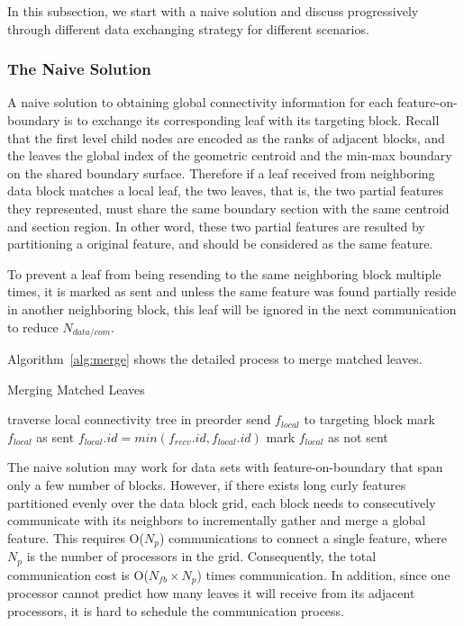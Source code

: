 In this subsection, we start with a naive solution and discuss progressively through different data exchanging strategy for different scenarios.

\subsubsection{The Naive Solution}

A naive solution to obtaining global connectivity information for each feature-on-boundary is to exchange its corresponding leaf with its targeting block. Recall that the first level child nodes are encoded as the ranks of adjacent blocks, and the leaves the global index of the geometric centroid and the min-max boundary on the shared boundary surface. Therefore if a leaf received from neighboring data block matches a local leaf, the two leaves, that is, the two partial features they represented, must share the same boundary section with the same centroid and section region. In other word, these two partial features are resulted by partitioning a original feature, and should be considered as the same feature.

To prevent a leaf from being resending to the same neighboring block multiple times, it is marked as sent and unless the same feature was found partially reside in another neighboring block, this leaf will be ignored in the next communication to reduce $N_{data/com}$.

Algorithm~\ref{alg:merge} shows the detailed process to merge matched leaves.
\begin{algorithm}
\caption{Merging Matched Leaves}
\label{alg:merge}
\begin{algorithmic}
\STATE traverse local connectivity tree in preorder
		\STATE send $f_{local}$ to targeting block
	\ENDIF
	\STATE mark $f_{local}$ as sent
\ENDFOR
{}
			\STATE $f_{local}.id = min(f_{recv}.id, f_{local}.id)$
			\STATE mark $f_{local}$ as not sent
		\ENDIF
	\ENDFOR	
\ENDFOR
\end{algorithmic}
\end{algorithm}

The naive solution may work for data sets with feature-on-boundary that span only a few number of blocks. However, if there exists long curly features partitioned evenly over the data block grid, each block needs to consecutively communicate with its neighbors to incrementally gather and merge a global feature. This requires O(${N_p}$) communications to connect a single feature, where ${N_p}$ is the number of processors in the grid. Consequently, the total communication cost is O(${N_{fb} \times N_p}$) times communication. In addition, since one processor cannot predict how many leaves it will receive from its adjacent processors, it is hard to schedule the communication process.


